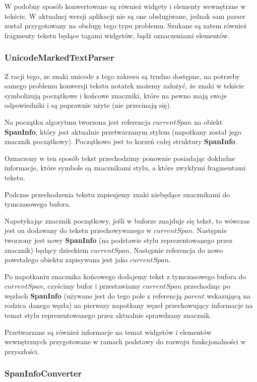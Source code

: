 W podobny sposób konwertowane są również widgety i elementy wewnętrzne w tekście. W aktualnej wersji aplikacji nie są one obsługiwane, jednak sam parser został przygotowany na obsługę tego typu problemu. Szukane są zatem również fragmenty tekstu będące tagami widgetów, bądź oznaczeniami elementów.

\subsubsection{UnicodeMarkedTextParser}

Z racji tego, ze znaki unicode z tego zakresu są trudno dostępne, na potrzeby samego problemu konwersji tekstu notatek możemy założyć, że znaki w tekście symbolizują początkowe i końcowe znaczniki, które na pewno mają swoje odpowiedniki i są poprawnie użyte (nie przecinają się).

Na początku algorytmu tworzona jest referencja $currentSpan$ na obiekt \textbf{SpanInfo}, który jest aktualnie przetwarzanym stylem (napotkany został jego znacznik początkowy). Początkowo jest to korzeń całej struktury \textbf{SpanInfo}.

Oznaczony w ten sposób tekst przechodzimy ponownie posiadając dokładne informacje, które symbole są znacznikami stylu, a które zwykłymi fragmentami tekstu.

Podczas przechodzenia tekstu zapisujemy znaki niebędące znacznikami do tymczasowego bufora.

Napotykając znacznik początkowy, jeśli w buforze znajduje się tekst, to wówczas jest on dodawany do tekstu przechowywanego w $currentSpan$. Następnie tworzony jest nowy \textbf{SpanInfo} (na podstawie stylu reprezentowanego przez znacznik) będący dzieckiem $currentSpan$. Następnie referencja do nowo powstałego obiektu zapisywana jest jako $currentSpan$. 

Po napotkaniu znacznika końcowego dodajemy tekst z tymczasowego bufora do $currentSpan$, czyścimy bufor i przestawiamy $currentSpan$ przechodząc po węzłach \textbf{SpanInfo} (używane jest do tego pole z referencją $parent$ wskazującą na rodzica danego węzła) na pierwszy napotkany węzeł przechowujący informacje na temat stylu reprezentowanego przez aktualnie sprawdzany znacznik.

Przetwarzane są również informacje na temat widgetów i elementów wewnętrznych przygotowane w ramach podstawy do rozwoju funkcjonalności w przyszłości.

\subsubsection{SpanInfoConverter}

